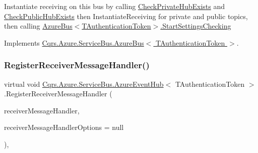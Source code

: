 Instantiate receiving on this bus by calling \hyperlink{classCqrs_1_1Azure_1_1ServiceBus_1_1AzureEventHub_a5eea5010c95290cb4081679538a06555_a5eea5010c95290cb4081679538a06555}{Check\+Private\+Hub\+Exists} and \hyperlink{classCqrs_1_1Azure_1_1ServiceBus_1_1AzureEventHub_ae60a7cddcb566ff8f5cf2ac2db17733e_ae60a7cddcb566ff8f5cf2ac2db17733e}{Check\+Public\+Hub\+Exists} then Instantiate\+Receiving for private and public topics, then calling \hyperlink{classCqrs_1_1Azure_1_1ServiceBus_1_1AzureBus_acb7f47329c17646805545e78d0776efe_acb7f47329c17646805545e78d0776efe}{Azure\+Bus$<$\+T\+Authentication\+Token$>$.\+Start\+Settings\+Checking} 



Implements \hyperlink{classCqrs_1_1Azure_1_1ServiceBus_1_1AzureBus_ac9f66dd531dcde49be72ba8f2cb28e9b_ac9f66dd531dcde49be72ba8f2cb28e9b}{Cqrs.\+Azure.\+Service\+Bus.\+Azure\+Bus$<$ T\+Authentication\+Token $>$}.

\mbox{\label{classCqrs_1_1Azure_1_1ServiceBus_1_1AzureEventHub_afbea0e107f3d4e8f8d4f2215ff2f7787_afbea0e107f3d4e8f8d4f2215ff2f7787}} 
\subsubsection{\texorpdfstring{Register\+Receiver\+Message\+Handler()}{RegisterReceiverMessageHandler()}}
{\footnotesize\ttfamily virtual void \hyperlink{classCqrs_1_1Azure_1_1ServiceBus_1_1AzureEventHub}{Cqrs.\+Azure.\+Service\+Bus.\+Azure\+Event\+Hub}$<$ T\+Authentication\+Token $>$.Register\+Receiver\+Message\+Handler (\begin{DoxyParamCaption}\item[{Action$<$ Partition\+Context, Event\+Data $>$}]{receiver\+Message\+Handler,  }\item[{Event\+Processor\+Options}]{receiver\+Message\+Handler\+Options = {\ttfamily null} }\end{DoxyParamCaption})\hspace{0.3cm}{\ttfamily [protected]}, {\ttfamily [virtual]}}



